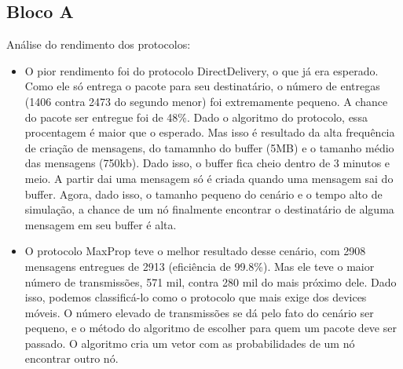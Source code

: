 \documentclass[conference]{IEEEtran}
\begin{document}
\subsection{Bloco A}
  Análise do rendimento dos protocolos:
  \begin{itemize}
    \item O pior rendimento foi do protocolo DirectDelivery, o que já era esperado. Como ele só entrega 
      o pacote para seu destinatário, o número de entregas (1406 contra 2473 do segundo menor) foi 
			extremamente pequeno.
			A chance do pacote ser entregue foi de 48\%. Dado o algoritmo do protocolo, essa procentagem é 
			maior que o esperado. Mas isso é resultado da alta frequência de criação de mensagens, do tamamnho 
			do buffer (5MB) e o tamanho médio das mensagens (750kb). Dado isso, o buffer fica cheio dentro de 
			3 minutos e meio. A partir dai uma mensagem só é criada quando uma mensagem sai do buffer. Agora, 
			dado isso, o tamanho pequeno do cenário e o tempo alto de simulação, a chance de um nó finalmente 
			encontrar o destinatário de alguma mensagem em seu buffer é alta.
		\item O protocolo MaxProp teve o melhor resultado desse cenário, com 2908 mensagens entregues de 2913
			(eficiência de 99.8\%). Mas ele teve o maior número de transmissões, 571 mil, contra 280 mil do mais
			próximo dele. Dado isso, podemos classificá-lo como o protocolo que mais exige dos devices móveis.
			O número elevado de transmissões se dá pelo fato do cenário ser pequeno, e o método do algoritmo 
			de escolher para quem um pacote deve ser passado. O algoritmo cria um vetor com as probabilidades
			de um nó encontrar outro nó. 
			

\end{itemize}
\end{document}
